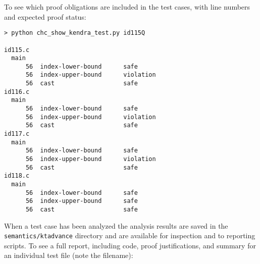 \documentclass[11pt]{article}
\begin{document}
To see which proof obligations are included in the test cases, with line numbers and
expected proof status:
\begin{verbatim}
> python chc_show_kendra_test.py id115Q

id115.c
  main
      56  index-lower-bound      safe                                                 
      56  index-upper-bound      violation                                            
      56  cast                   safe                                                 
id116.c
  main
      56  index-lower-bound      safe                                                 
      56  index-upper-bound      violation                                            
      56  cast                   safe                                                 
id117.c
  main
      56  index-lower-bound      safe                                                 
      56  index-upper-bound      violation                                            
      56  cast                   safe                                                 
id118.c
  main
      56  index-lower-bound      safe                                                 
      56  index-upper-bound      safe                                                 
      56  cast                   safe 
\end{verbatim} 
When a test case has been analyzed the analysis results are saved in the 
{\tt semantics/ktadvance} directory and are available for inspection and to
reporting scripts.
To see a full report, including code, proof justifications, and summary for an individual
test file (note the filename):
\end{document}
